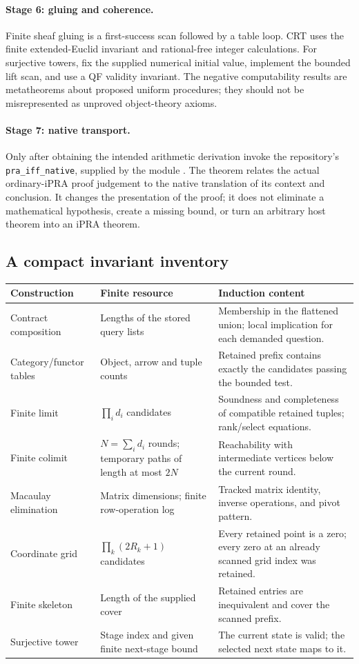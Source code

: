\paragraph{Stage 6: gluing and coherence.}
Finite sheaf gluing is a first-success scan followed by a table loop. CRT uses
the finite extended-Euclid invariant and rational-free integer calculations.
For surjective towers, fix the supplied numerical initial value, implement the
bounded lift scan, and use a QF validity invariant. The negative computability
results are metatheorems about proposed uniform procedures; they should not be
misrepresented as unproved object-theory axioms.

\paragraph{Stage 7: native transport.}
Only after obtaining the intended arithmetic derivation invoke the repository's
\texttt{pra\_iff\_native}, supplied by the module
\cite{repo-native}. The theorem relates the actual ordinary-iPRA proof
judgement to the native translation of its context and conclusion. It changes
the presentation of the proof; it does not eliminate a mathematical hypothesis,
create a missing bound, or turn an arbitrary host theorem into an iPRA theorem.

\subsection{A compact invariant inventory}

\begin{longtable}{@{}P{.24\linewidth}P{.32\linewidth}P{.35\linewidth}@{}}
\toprule
Construction & Finite resource & Induction content\\
\midrule\endhead
Contract composition & Lengths of the stored query lists & Membership in the
flattened union; local implication for each demanded question.\\
Category/functor tables & Object, arrow and tuple counts & Retained prefix
contains exactly the candidates passing the bounded test.\\
Finite limit & $\prod_i d_i$ candidates & Soundness and completeness of
compatible retained tuples; rank/select equations.\\
Finite colimit & $N=\sum_i d_i$ rounds; temporary paths of length at most $2N$
& Reachability with intermediate vertices below the current round.\\
Macaulay elimination & Matrix dimensions; finite row-operation log & Tracked
matrix identity, inverse operations, and pivot pattern.\\
Coordinate grid & $\prod_k(2R_k+1)$ candidates & Every retained point is a zero;
every zero at an already scanned grid index was retained.\\
Finite skeleton & Length of the supplied cover & Retained entries are
inequivalent and cover the scanned prefix.\\
Surjective tower & Stage index and given finite next-stage bound & The current
state is valid; the selected next state maps to it.\\
\bottomrule
\end{longtable}

